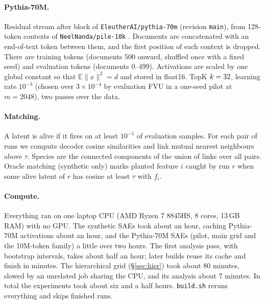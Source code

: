 \paragraph{Pythia-70M.} Residual stream after block \RealLayer{} of \texttt{EleutherAI/pythia-70m} (revision \texttt{main}), from 128-token contexts of \texttt{NeelNanda/pile-10k} \citep{pile10k}. Documents are concatenated with an end-of-text token between them, and the first position of each context is dropped. There are \RealTrainTokens{} training tokens (documents 500 onward, shuffled once with a fixed seed) and \RealEvalTokens{} evaluation tokens (documents 0--499). Activations are scaled by one global constant so that $\mathbb E\|x\|^2=d$ and stored in float16. TopK $k=32$, learning rate $10^{-3}$ (chosen over $3\times10^{-4}$ by evaluation FVU in a one-seed pilot at $m=2048$), two passes over the data.

\paragraph{Matching.} A latent is alive if it fires on at least $10^{-5}$ of evaluation samples. For each pair of runs we compute decoder cosine similarities and link mutual nearest neighbours above $\tau$. Species are the connected components of the union of links over all pairs. Oracle matching (synthetic only) marks planted feature $i$ caught by run $r$ when some alive latent of $r$ has cosine at least $\tau$ with $f_i$.

\paragraph{Compute.} Everything ran on one laptop CPU (AMD Ryzen 7 8845HS, 8 cores, 13\,GB RAM) with no GPU. The synthetic SAEs took about an hour, caching Pythia-70M activations about an hour, and the Pythia-70M SAEs (pilot, main grid and the 10M-token family) a little over two hours. The first analysis pass, with bootstrap intervals, takes about half an hour; later builds reuse its cache and finish in minutes. The hierarchical grid (\S\ref{sec:hier}) took about 80 minutes, slowed by an unrelated job sharing the CPU, and its analysis about 7 minutes. In total the experiments took about six and a half hours. \texttt{build.sh} reruns everything and skips finished runs.

